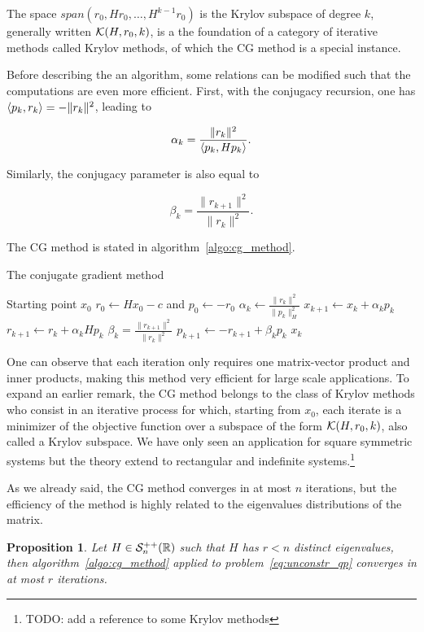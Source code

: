 \documentclass[10pt]{article}
\newtheorem{proposition}[theorem]{Proposition}
\numberwithin{equation}{section}
\begin{document}
	The space $span(r_0,Hr_0,\ldots,H^{k-1}r_0)$ is the Krylov subspace of degree $k$, generally written ${\mathcal{K}}(H,r_0,k)$, is a the foundation of a category of iterative methods called Krylov methods, of which the CG method is a special instance. 
	
	Before describing the an algorithm, some relations can be modified such that the computations are even more efficient. First, with the conjugacy recursion, one has $\left\langle {p_k} , {r_k} \right\rangle = - \|r_k\|^2$, leading to 
	
	\[\alpha_k = \dfrac{\|r_k\|^2}{\left\langle {p_k} , {Hp_k} \right\rangle}.\]
	
	Similarly, the conjugacy parameter is also equal to 
	
	\[\beta_k = \dfrac{\|r_{k+1}\|^2}{\|r_k\|^2}.\]
	
	The CG method is stated in algorithm~\ref{algo:cg_method}.
	
	\begin{algorithm}
		\caption{The conjugate gradient method}\label{algo:cg_method}
		\begin{algorithmic}
			\Require Starting point $x_0$
			\State $r_0 \gets Hx_0-c$ and $p_0 \gets -r_0$
				\State $\alpha_k \gets \frac{\|r_k\|^2}{\|p_k\|^2_H}$
				\State $x_{k+1} \gets x_k+\alpha_kp_k$
				\State $r_{k+1} \gets r_k + \alpha_kHp_k$
				\State $\beta_k =  \frac{\|r_{k+1}\|^2}{\|r_k\|^2}$
				\State $p_{k+1} \gets -r_{k+1}+\beta_kp_k$
			\EndFor{}
			\Return $x_k$
		\end{algorithmic}
	\end{algorithm} 
	
	 One can observe that each iteration only requires one matrix-vector product and inner products, making this method very efficient for large scale applications. To expand an earlier remark, the CG method belongs to the class of Krylov methods who consist in an iterative process for which, starting from $x_0$, each iterate is a minimizer of the objective function over a subspace of the form ${\mathcal{K}}(H,r_0,k)$, also called a Krylov subspace. We have only seen an application for square symmetric systems but the theory extend to rectangular and indefinite systems.\footnote{TODO: add a reference to some Krylov methods}
	 
	 As we already said, the CG method converges in at most $n$ iterations, but the efficiency of the method is highly related to the eigenvalues distributions of the matrix.
	 
	 \begin{proposition}
	 	Let $H\in {\mathcal{S}}_n^{++}({\mathbb{R}})$ such that $H$ has $r<n$ distinct eigenvalues, then algorithm~\ref{algo:cg_method} applied to problem~\eqref{eq:unconstr_qp} converges in at most $r$ iterations. 
	 \end{proposition}
	 
\end{document}
